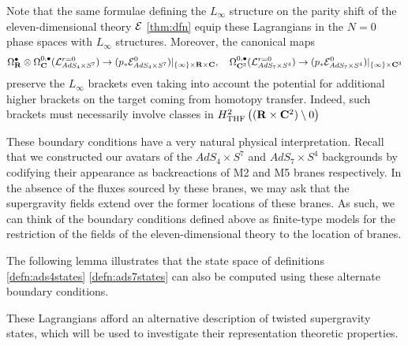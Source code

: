 \documentclass[../main.tex]{subfiles}
\begin{document}
Note that the same formulae defining the $L_\infty$ structure on the parity shift of the eleven-dimensional theory $\mathcal{E}$ \ref{thm:dfn} equip these Lagrangians in the $N=0$ phase spaces with $L_\infty$ structures. Moreover, the canonical maps
\[
\Omega^\bullet_{\mathbf{R}} \otimes \Omega^{0,\bullet}_{\mathbf{C}} (\mathcal{L}^{r=0}_{AdS_4\times S^7} ) \to (p_* \mathcal{E}^0 _{AdS_4\times S^7})|_{\{\infty\} \times \mathbf{R}\times \mathbf{C}}, \quad \Omega^{0,\bullet}_{\mathbf{C}^3} (\mathcal{L}^{r=0}_{AdS_7\times S^4} ) \to (p_* \mathcal{E}^0 _{AdS_7\times S^4})|_{\{\infty\} \times \mathbf{C}^3}
\]
preserve the $L_\infty$ brackets even taking into account the potential for additional higher brackets on the target coming from homotopy transfer. Indeed, such brackets must necessarily involve classes in $H^2_{\mathrm{THF}} \left ( (\mathbf{R}\times \mathbf{C}^2)\setminus 0 \right )$

\begin{rmk}
These boundary conditions have a very natural physical interpretation. Recall that we constructed our avatars of the $AdS_4\times S^7$ and $AdS_7\times S^4$ backgrounds by codifying their appearance as backreactions of M2 and M5 branes respectively. In the absence of the fluxes sourced by these branes, we may ask that the supergravity fields extend over the former locations of these branes. As such, we can think of the boundary conditions defined above as finite-type models for the restriction of the fields of the eleven-dimensional theory to the location of branes. 
\end{rmk}

\parsec[]

The following lemma illustrates that the state space of definitions \ref{defn:ads4states} \ref{defn:ads7states} can also be computed using these alternate boundary conditions.

These Lagrangians afford an alternative description of twisted supergravity states, which will be used to investigate their representation theoretic properties.
\end{document}
